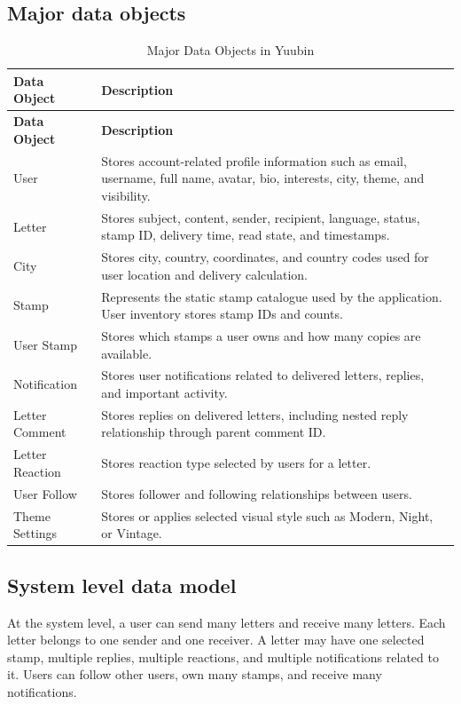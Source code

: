 ﻿\documentclass[12pt,a4paper]{report}
\begin{document}
\subsection{Major data objects}

\begin{longtable}{p{4cm} p{10cm}}
\caption{Major Data Objects in Yuubin}
\label{tab:data_objects}\\
\toprule
\textbf{Data Object} & \textbf{Description} \\
\midrule
\endfirsthead
\toprule
\textbf{Data Object} & \textbf{Description} \\
\midrule
\endhead
User & Stores account-related profile information such as email, username, full name, avatar, bio, interests, city, theme, and visibility. \\
Letter & Stores subject, content, sender, recipient, language, status, stamp ID, delivery time, read state, and timestamps. \\
City & Stores city, country, coordinates, and country codes used for user location and delivery calculation. \\
Stamp & Represents the static stamp catalogue used by the application. User inventory stores stamp IDs and counts. \\
User Stamp & Stores which stamps a user owns and how many copies are available. \\
Notification & Stores user notifications related to delivered letters, replies, and important activity. \\
Letter Comment & Stores replies on delivered letters, including nested reply relationship through parent comment ID. \\
Letter Reaction & Stores reaction type selected by users for a letter. \\
User Follow & Stores follower and following relationships between users. \\
Theme Settings & Stores or applies selected visual style such as Modern, Night, or Vintage. \\
\bottomrule
\end{longtable}

\subsection{System level data model}

At the system level, a user can send many letters and receive many letters. Each letter belongs to one sender and one receiver. A letter may have one selected stamp, multiple replies, multiple reactions, and multiple notifications related to it. Users can follow other users, own many stamps, and receive many notifications.
\end{document}
